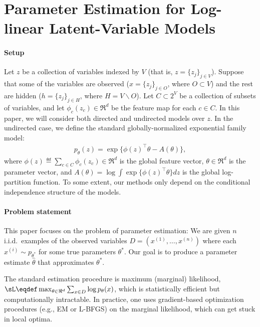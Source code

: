 \section{Parameter Estimation for Log-linear Latent-Variable Models}
\label{sec:log-linear}

\paragraph{Setup}
Let $z$ be a collection of variables indexed by $V$ (that is, $z = \{z_j\}_{j \in V}$).
Suppose that some of the variables are observed ($x = \{ z_j \}_{j \in O}$, where $O \subset V$) 
and the rest are hidden ($h = \{ z_j \}_{j \in H}$, where $H = V \backslash O$).
Let $C \subset 2^V$ be a collection of subsets of variables,
and let $\phi_c(z_c) \in \Re^d$ be the feature map for each $c \in C$.
In this paper, we will consider both directed and undirected models over $z$.
In the undirected case, we define the standard globally-normalized exponential family model:
\begin{align}
  \label{eqn:undirectedSetup}
  p_\theta(z) = \exp\{ \phi(z)^\top\theta - A(\theta) \},
\end{align}
where $\phi(z) \eqdef \sum_{c \in C} \phi_c(z_c) \in \Re^d$ is the global feature vector, $\theta \in \Re^d$ is the parameter vector,
and $A(\theta) = \log \int \exp\{\phi(z)^\top\theta\} dz$ is the global log-partition function.
To some extent, our methods only depend on the conditional independence
structure of the models.

\paragraph{Problem statement}

This paper focuses on the problem of parameter estimation:
We are given $n$ i.i.d.~examples of the observed variables $D = (x^{(1)}, \dots, x^{(n)})$
where each $x^{(i)} \sim p_{\theta^*}$ for some true parameters $\theta^*$.
Our goal is to produce a parameter estimate $\hat\theta$ that approximates $\theta^*$.

The standard estimation procedure is maximum (marginal) likelihood,
$\sL \eqdef \max_{\theta \in \Re^d} \sum_{x \in D} \log p_\theta(x)$,
which is statistically efficient but computationally intractable.
In practice, one uses gradient-based optimization procedures (e.g., EM or L-BFGS)
on the marginal likelihood, which can get stuck in local optima.

